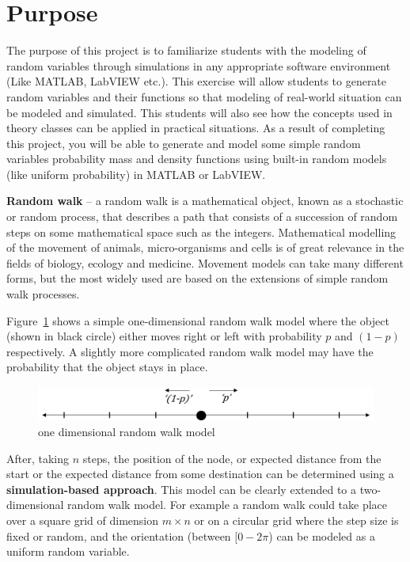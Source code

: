 \documentclass[a4paper, 11pt]{article}
\begin{document}
\section{Purpose} 
The purpose of this project is to familiarize students with the modeling of random variables through simulations in any appropriate software environment (Like MATLAB, LabVIEW etc.). This exercise will allow students to generate random variables and their functions so that modeling of real-world situation can be modeled and simulated.  This students will also see how the concepts used in theory classes can be applied in practical situations. As a result of completing this project, you will be able to generate and model some simple random variables probability mass and density functions using built-in random models (like uniform probability) in MATLAB or LabVIEW.   

\textbf{Random walk} -- a random walk is a mathematical object, known as a stochastic or random process, that describes a path that consists of a succession of random steps on some mathematical space such as the integers. Mathematical modelling of the movement of animals, micro-organisms and cells is of great relevance in the fields of biology, ecology and medicine. Movement models can take many different forms, but the most widely used are based on the extensions of simple random walk processes.

Figure~\ref{fig:1} shows a simple one-dimensional random walk model where the object (shown in black circle) either moves right or left with probability $p$ and $(1-p)$ respectively. A slightly more complicated random walk model may have the probability that the object stays in place. 

\begin{figure}[h]
\begin{center}
	\includegraphics[scale=0.9]{simpleRandomWalk.jpg}
\end{center}	
\caption{one dimensional random walk model}
\label{fig:1}
\end{figure}

After, taking $n$ steps, the position of the node, or expected distance from the start or the expected distance from some destination can be determined using a \textbf{simulation-based approach}.  This model can be clearly extended to a two-dimensional random walk model. For example a random walk could take place over a square grid of dimension $m \times n$ or on a circular grid where the step size is fixed or random, and the orientation (between $[0 - 2\pi$) can be modeled as a uniform random variable.
\end{document}
